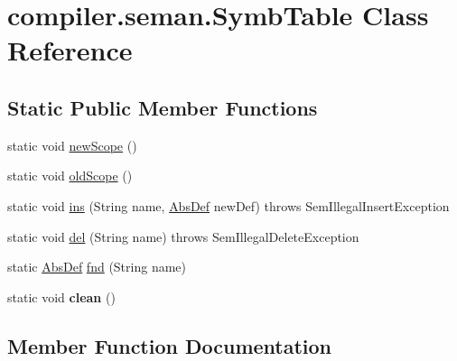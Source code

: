 \hypertarget{classcompiler_1_1seman_1_1_symb_table}{}\section{compiler.\+seman.\+Symb\+Table Class Reference}
\label{classcompiler_1_1seman_1_1_symb_table}
\subsection*{Static Public Member Functions}
\begin{DoxyCompactItemize}
\item 
static void \hyperlink{classcompiler_1_1seman_1_1_symb_table_a720c5ab590fda1ce72c663bbd93a5c59}{new\+Scope} ()
\item 
static void \hyperlink{classcompiler_1_1seman_1_1_symb_table_aec82249448465a18d52d2c0371a3bc72}{old\+Scope} ()
\item 
static void \hyperlink{classcompiler_1_1seman_1_1_symb_table_a6c65cc874971dc94ce10c401c86afbc5}{ins} (String name, \hyperlink{classcompiler_1_1abstr_1_1tree_1_1def_1_1_abs_def}{Abs\+Def} new\+Def)  throws Sem\+Illegal\+Insert\+Exception 
\item 
static void \hyperlink{classcompiler_1_1seman_1_1_symb_table_ad5b2df37c9e2430f48f4285122fc9d34}{del} (String name)  throws Sem\+Illegal\+Delete\+Exception 
\item 
static \hyperlink{classcompiler_1_1abstr_1_1tree_1_1def_1_1_abs_def}{Abs\+Def} \hyperlink{classcompiler_1_1seman_1_1_symb_table_a638dde2019f3bbe8e31976ca0650bef6}{fnd} (String name)
\item 
\mbox{\label{classcompiler_1_1seman_1_1_symb_table_ad6ebcede1d0c9ec0b83764cb3cd373ec}} 
static void {\bfseries clean} ()
\end{DoxyCompactItemize}


\subsection{Member Function Documentation}
\mbox{\label{classcompiler_1_1seman_1_1_symb_table_ad5b2df37c9e2430f48f4285122fc9d34}} 

